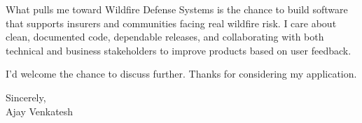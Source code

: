 \documentclass[letterpaper,11pt]{article}
\begin{document}
What pulls me toward Wildfire Defense Systems is the chance to build software that supports insurers and communities facing real wildfire risk. I care about clean, documented code, dependable releases, and collaborating with both technical and business stakeholders to improve products based on user feedback.

I'd welcome the chance to discuss further. Thanks for considering my application.

\vspace{12pt}
Sincerely, \\
Ajay Venkatesh
\end{document}
